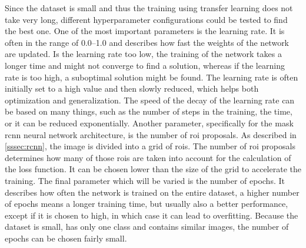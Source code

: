 Since the dataset is small and thus the training using transfer learning does not take very long, different hyperparameter configurations could be tested to find the best one.
One of the most important parameters is the learning rate.
It is often in the range of \SIrange{0.0}{1.0}{} and describes how fast the weights of the network are updated.
Is the learning rate too low, the training of the network takes a longer time and might not converge to find a solution, whereas if the learning rate is too high, a suboptimal solution might be found.
The learning rate is often initially set to a high value and then slowly reduced, which helps both optimization and generalization.
The speed of the decay of the learning rate can be based on many things, such as the number of steps in the training, the time, or it can be reduced exponentially.
Another parameter, specifically for the mask \gls{rcnn} neural network architecture, is the number of \gls{roi} proposals.
As described in \cref{sssec:rcnn}, the image is divided into a grid of \glspl{roi}.
The number of \gls{roi} proposals determines how many of those \glspl{roi} are taken into account for the calculation of the loss function.
It can be chosen lower than the size of the grid to accelerate the training.
The final parameter which will be varied is the number of epochs.
It describes how often the network is trained on the entire dataset, a higher number of epochs means a longer training time, but usually also a better performance, except if it is chosen to high, in which case it can lead to overfitting.
Because the dataset is small, has only one class and contains similar images, the number of epochs can be chosen fairly small.

